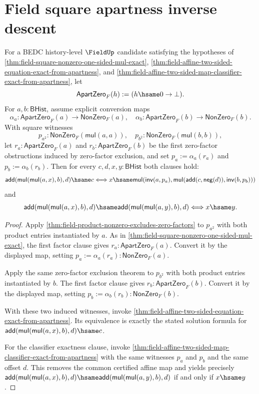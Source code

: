 \section{Field square apartness inverse descent}

\begin{theorem}
\label{thm:field-square-certified-two-sided-affine-exact}
For a BEDC history-level $\FieldUp$ candidate satisfying the hypotheses of
\autoref{thm:field-square-nonzero-one-sided-mul-exact},
\autoref{thm:field-affine-two-sided-equation-exact-from-apartness}, and
\autoref{thm:field-affine-two-sided-map-classifier-exact-from-apartness},
let
$$
\mathsf{ApartZero}_F(h) := (h\hsame0\to\bot).
$$
For $a,b:\mathsf{BHist}$, assume explicit conversion maps
$$
\alpha_a:\mathsf{ApartZero}_F(a)\to\mathsf{NonZero}_F(a),
\quad
\alpha_b:\mathsf{ApartZero}_F(b)\to\mathsf{NonZero}_F(b).
$$
With square witnesses
$$
p_{a^2}:\mathsf{NonZero}_F(\mathsf{mul}(a,a)),
\quad
p_{b^2}:\mathsf{NonZero}_F(\mathsf{mul}(b,b)),
$$
let $r_a:\mathsf{ApartZero}_F(a)$ and $r_b:\mathsf{ApartZero}_F(b)$ be the
first zero-factor obstructions induced by zero-factor exclusion, and set
$p_a:=\alpha_a(r_a)$ and $p_b:=\alpha_b(r_b)$. Then for every
$c,d,x,y:\mathsf{BHist}$ both clauses hold:
$$
\mathsf{add}(\mathsf{mul}(\mathsf{mul}(a,x),b),d)\hsame c
\Longleftrightarrow
x\hsame
\mathsf{mul}(\mathsf{inv}(a,p_a),
\mathsf{mul}(\mathsf{add}(c,\mathsf{neg}(d)),\mathsf{inv}(b,p_b)))
$$
and
$$
\mathsf{add}(\mathsf{mul}(\mathsf{mul}(a,x),b),d)\hsame
\mathsf{add}(\mathsf{mul}(\mathsf{mul}(a,y),b),d)
\Longleftrightarrow
x\hsame y.
$$
\end{theorem}
\begin{proof}
Apply \autoref{thm:field-product-nonzero-excludes-zero-factors} to
$p_{a^2}$ with both product entries instantiated by $a$. As in
\autoref{thm:field-square-nonzero-one-sided-mul-exact}, the first factor
clause gives $r_a:\mathsf{ApartZero}_F(a)$. Convert it by the displayed map,
setting $p_a:=\alpha_a(r_a):\mathsf{NonZero}_F(a)$.

Apply the same zero-factor exclusion theorem to $p_{b^2}$ with both product
entries instantiated by $b$. The first factor clause gives
$r_b:\mathsf{ApartZero}_F(b)$. Convert it by the displayed map, setting
$p_b:=\alpha_b(r_b):\mathsf{NonZero}_F(b)$.

With these two induced witnesses, invoke
\autoref{thm:field-affine-two-sided-equation-exact-from-apartness}. Its
equivalence is exactly the stated solution formula for
$\mathsf{add}(\mathsf{mul}(\mathsf{mul}(a,x),b),d)\hsame c$.

For the classifier exactness clause, invoke
\autoref{thm:field-affine-two-sided-map-classifier-exact-from-apartness} with
the same witnesses $p_a$ and $p_b$ and the same offset $d$. This removes the
common certified affine map and yields precisely
$\mathsf{add}(\mathsf{mul}(\mathsf{mul}(a,x),b),d)\hsame
\mathsf{add}(\mathsf{mul}(\mathsf{mul}(a,y),b),d)$ if and only if
$x\hsame y$.
\end{proof}

